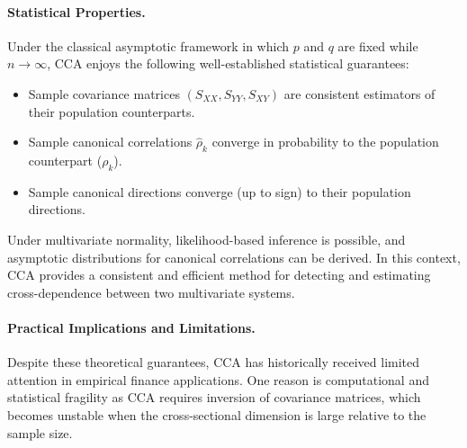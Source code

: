 \documentclass[12pt]{report} %
\begin{document}
\paragraph{Statistical Properties.}

Under the classical asymptotic framework in which $p$ and $q$ are fixed while $n \to \infty$, CCA 
enjoys the following well-established statistical guarantees:
\begin{itemize}
    \item Sample covariance matrices $(S_{XX}, S_{YY}, S_{XY})$ are consistent estimators 
	of their population counterparts.
    \item Sample canonical correlations $\hat{\rho}_k$ converge in probability to the population 
	counterpart ($\rho_k$).
    \item Sample canonical directions converge (up to sign) to their population directions.
\end{itemize}
Under multivariate normality, likelihood-based inference is possible, and asymptotic 
distributions for canonical correlations can be derived. In this context, CCA provides a 
consistent and efficient method for detecting and estimating cross-dependence between 
two multivariate systems.

\paragraph{Practical Implications and Limitations.} Despite these theoretical guarantees, CCA 
has historically received limited attention in empirical finance applications. One reason is 
computational and statistical fragility as CCA requires inversion of covariance matrices, 
which becomes unstable when the cross-sectional dimension is large relative to the sample size. 

\end{document}
